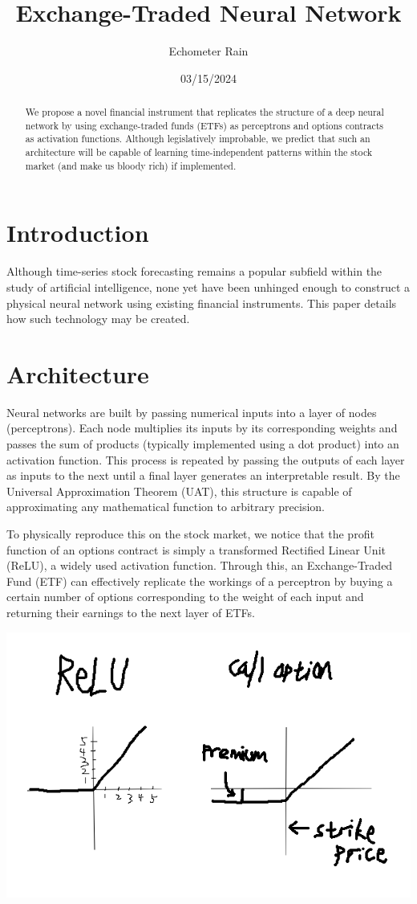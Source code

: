 \documentclass[12pt]{article}
\title{Exchange-Traded Neural Network}
\author{Echometer Rain}
\date{03/15/2024}
\begin{document}
\maketitle

\begin{abstract}
  We propose a novel financial instrument that replicates the structure of a deep neural network by using exchange-traded funds (ETFs) as perceptrons and options contracts as activation functions. Although legislatively improbable, we predict that such an architecture will be capable of learning time-independent patterns within the stock market (and make us bloody rich) if implemented.
\end{abstract}
\section{Introduction}
Although time-series stock forecasting remains a popular subfield within the study of artificial intelligence, none yet have been unhinged enough to construct a physical neural network using existing financial instruments. This paper details how such technology may be created.
\section{Architecture}
Neural networks are built by passing numerical inputs into a layer of nodes (perceptrons). Each node multiplies its inputs by its corresponding weights and passes the sum of products (typically implemented using a dot product) into an activation function. This process is repeated by passing the outputs of each layer as inputs to the next until a final layer generates an interpretable result. By the Universal Approximation Theorem (UAT), this structure is capable of approximating any mathematical function to arbitrary precision. \newline

To physically reproduce this on the stock market, we notice that the profit function of an options contract is simply a transformed Rectified Linear Unit (ReLU), a widely used activation function. Through this, an Exchange-Traded Fund (ETF) can effectively replicate the workings of a perceptron by buying a certain number of options corresponding to the weight of each input and returning their earnings to the next layer of ETFs.

\includegraphics[scale=0.8]{./relu.png}
\end{document}
